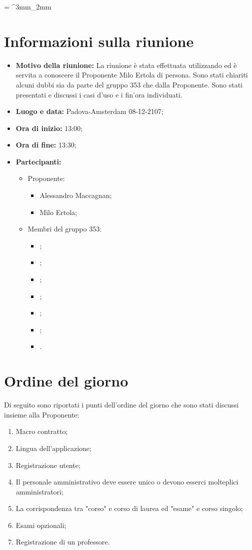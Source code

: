 \documentclass[VER-2017-12-08.tex]{subfiles}
\begin{document}
\tabulinesep = ^3mm_2mm
\chapter{Informazioni sulla riunione}
\begin{itemize}
	\item \textbf{Motivo della riunione:} La riunione è stata effettuata utilizzando  ed è servita a conoscere il Proponente Milo Ertola di persona. Sono stati chiariti alcuni dubbi sia da parte del gruppo 353 che dalla Proponente. Sono stati presentati e discussi i casi d'uso e i  fin'ora individuati.

	\item \textbf{Luogo e data:} Padova-Amsterdam 08-12-2107;
	\item \textbf{Ora di inizio:} 13:00;
	\item \textbf{Ora di fine:} 13:30;
	\item \textbf{Partecipanti:}
	\begin{itemize}
		\item Proponente:
		\begin{itemize}
			\item Alessandro Maccagnan;
			\item Milo Ertola;
		\end{itemize}
		\item Membri del gruppo 353:
		\begin{itemize}
			\item \Davide;
			\item \Elena;
			\item \Gianluca;
			\item \Mirco;
			\item \Parwinder;
			\item \Riccardo;
			\item \Valentina.
		\end{itemize}
	\end{itemize}
\end{itemize}
\chapter{Ordine del giorno}	
Di seguito sono riportati i punti dell'ordine del giorno che sono stati discussi insieme alla Proponente:
\begin{enumerate}
	\item Macro contratto; 
	\item Lingua dell'applicazione;
	\item Registrazione utente;
	\item Il personale amministrativo deve essere unico o devono esserci molteplici amministratori;
	\item La corrispondenza tra  "corso" e corso di laurea ed "esame" e corso singolo;
	\item Esami opzionali;
	\item Registrazione di un professore.
\end{enumerate}
\end{document}
